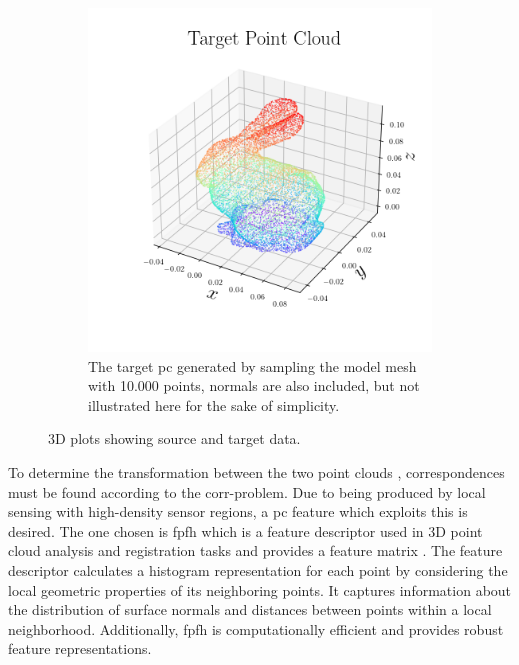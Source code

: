 \begin{figure}[!h]
\begin{subfigure}[b]{0.48\textwidth}
		\includegraphics[width=\textwidth]{chapters/1-tactile-perception/fig/matplotlib/pc_target.png}
		\caption{The target \gls{pc} generated by sampling the model mesh with \num{10,000} points, normals are also included, but not illustrated here for the sake of simplicity.}
		\label{fig:pe-pc-target}
	\end{subfigure}
	\caption{3D plots showing source and target data.}
	\label{fig:pe-contact-position-gazebo}
\end{figure}

To determine the transformation between the two point clouds , correspondences must be found according to the \gls{corr-problem}. Due to  being produced by local sensing with high-density sensor regions, a \gls{pc} feature which exploits this is desired. The one chosen is \gls{fpfh} which is a feature descriptor used in 3D point cloud analysis and registration tasks and provides a feature matrix . The feature descriptor calculates a histogram representation for each point by considering the local geometric properties of its neighboring points. It captures information about the distribution of surface normals and distances between points within a local neighborhood. Additionally, \gls{fpfh} is computationally efficient and provides robust feature representations. \medskip


